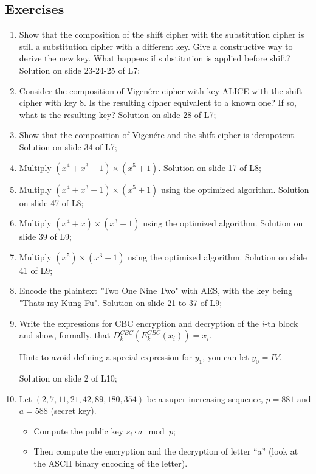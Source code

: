 \subsection{Exercises}
\begin{enumerate}
    \item Show that the composition of the shift cipher with the substitution cipher is still a substitution cipher with a different key. Give a constructive way to derive the new key. What happens if substitution is applied before shift? Solution on slide 23-24-25 of L7;
    \item Consider the composition of Vigenére cipher with key ALICE with the shift cipher with key 8. Is the resulting cipher equivalent to a known one? If so, what is the resulting key? Solution on slide 28 of L7;
    \item Show that the composition of Vigenére and the shift cipher is idempotent. Solution on slide 34 of L7;
    \item Multiply $(x^4 + x^3 + 1) \times (x^5 + 1)$. Solution on slide 17 of L8;
    \item Multiply $(x^4 + x^3 + 1) \times (x^5 + 1)$ using the optimized algorithm. Solution on slide 47 of L8;
    \item Multiply $(x^4 + x) \times (x^3 + 1)$ using the optimized algorithm. Solution on slide 39 of L9;
    \item Multiply $(x^5) \times (x^3 + 1)$ using the optimized algorithm. Solution on slide 41 of L9;
    \item Encode the plaintext "Two One Nine Two" with AES, with the key being "Thats my Kung Fu". Solution on slide 21 to 37 of L9;
    \item Write the expressions for CBC encryption and decryption of the $i$-th block and show, formally, that $D^{CBC}_k(E^{CBC}_k(x_i)) = x_i$.
    
    Hint: to avoid defining a special expression for $y_1$, you can let $y_0 = IV$.

    Solution on slide 2 of L10;

    \item Let $(2, 7, 11, 21, 42, 89, 180, 354)$ be a super-increasing sequence, $p=881$ and $a=588$ (secret key). 
    
    \begin{itemize}
        \item Compute the public key $s_i \cdot a \mod p$;
        \item Then compute the encryption and the decryption of letter “a” (look at the ASCII binary encoding of the letter).
    \end{itemize}


\end{enumerate}
